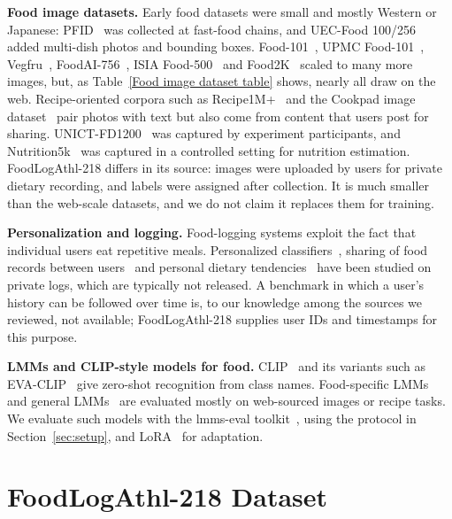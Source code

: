 \documentclass[sigconf, nonacm]{acmart}
\begin{document}
\textbf{Food image datasets.} Early food datasets were small and mostly Western or Japanese: PFID~\cite{chen2009pfid} was collected at fast-food chains, and UEC-Food 100/256~\cite{matsuda2012multiple, kawano2015automatic} added multi-dish photos and bounding boxes. Food-101~\cite{bossard2014food}, UPMC Food-101~\cite{wang2015recipe}, Vegfru~\cite{hou2017vegfru}, FoodAI-756~\cite{sahoo2019foodai}, ISIA Food-500~\cite{min2020isia} and Food2K~\cite{min2023large} scaled to many more images, but, as Table~\ref{Food image dataset table} shows, nearly all draw on the web. Recipe-oriented corpora such as Recipe1M+~\cite{marin2019learning} and the Cookpad image dataset~\cite{harashima2017cookpad} pair photos with text but also come from content that users post for sharing. UNICT-FD1200~\cite{farinella2016retrieval} was captured by experiment participants, and Nutrition5k~\cite{thames2021nutrition5k} was captured in a controlled setting for nutrition estimation. FoodLogAthl-218 differs in its source: images were uploaded by users for private dietary recording, and labels were assigned after collection. It is much smaller than the web-scale datasets, and we do not claim it replaces them for training.

\textbf{Personalization and logging.} Food-logging systems exploit the fact that individual users eat repetitive meals. Personalized classifiers~\cite{Horiguchi2018Personalized, flg469}, sharing of food records between users~\cite{Kim2021Boosting} and personal dietary tendencies~\cite{Aizawa2013FoodBalance} have been studied on private logs, which are typically not released. A benchmark in which a user's history can be followed over time is, to our knowledge among the sources we reviewed, not available; FoodLogAthl-218 supplies user IDs and timestamps for this purpose.

\textbf{LMMs and CLIP-style models for food.} CLIP~\cite{CLIP} and its variants such as EVA-CLIP~\cite{sun2023eva} give zero-shot recognition from class names. Food-specific LMMs~\cite{yin2023foodlmm, jiao2024rode, Imajuku2025FoodMLLM} and general LMMs~\cite{achiam2023gpt, liu2024visual, liu2024improved} are evaluated mostly on web-sourced images or recipe tasks. We evaluate such models with the lmms-eval toolkit~\cite{lmms_eval2024, zhang2024lmmsevalrealitycheckevaluation}, using the protocol in Section~\ref{sec:setup}, and LoRA~\cite{hu2022lora} for adaptation.



\section{FoodLogAthl-218 Dataset}
\end{document}
